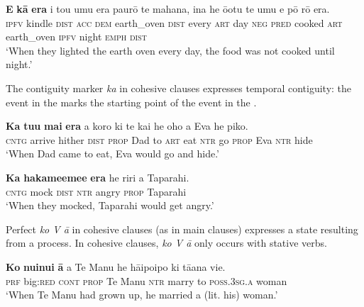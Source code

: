 \ea\label{ex:11.214}
\gll \textbf{E} \textbf{kā} \textbf{era} i tou {\ꞌ}umu era paurō te mahana,  {\ꞌ}ina he {\ꞌ}ō{\ꞌ}otu te {\ꞌ}umu e pō rō era.\\
\textsc{ipfv} kindle \textsc{dist} \textsc{acc} \textsc{dem} earth\_oven \textsc{dist} every \textsc{art} day  \textsc{neg} \textsc{pred} cooked \textsc{art} earth\_oven \textsc{ipfv} night \textsc{emph} \textsc{dist}\\

\glt 
‘When they lighted the earth oven every day, the food was not cooked until night.’ \textstyleExampleref{[R352.013]} 
\z

The contiguity marker \textit{ka} in cohesive clauses expresses temporal contiguity: the event in the  marks the starting point of the event in the .

\ea\label{ex:11.215}
\gll \textbf{Ka} \textbf{tu{\ꞌ}u} \textbf{mai} \textbf{era} a koro ki te kai he oho a Eva he piko. \\
\textsc{cntg} arrive hither \textsc{dist} \textsc{prop} Dad to \textsc{art} eat \textsc{ntr} go \textsc{prop} Eva \textsc{ntr} hide \\

\glt 
‘When Dad came to eat, Eva would go and hide.’ \textstyleExampleref{[R210.026]} 
\z

\ea\label{ex:11.216}
\gll \textbf{Ka} \textbf{hakame{\ꞌ}eme{\ꞌ}e} \textbf{era} he riri a Taparahi. \\
\textsc{cntg} mock \textsc{dist} \textsc{ntr} angry \textsc{prop} Taparahi \\

\glt 
‘When they mocked, Taparahi would get angry.’ \textstyleExampleref{[R250.151]} 
\z

Perfect  \textit{ko V {\ꞌ}ā} in cohesive clauses (as in main clauses) expresses a state resulting from a process. In cohesive clauses, \textit{ko V {\ꞌ}ā} only occurs with stative verbs.

\ea\label{ex:11.217}
\gll \textbf{Ko} \textbf{nuinui} \textbf{{\ꞌ}ā} a Te Manu he hāipoipo ki tā{\ꞌ}ana vi{\ꞌ}e.\\
\textsc{prf} big:\textsc{red} \textsc{cont} \textsc{prop} Te Manu \textsc{ntr} marry to \textsc{poss.3sg.a} woman\\

\glt 
‘When Te Manu had grown up, he married a (lit. his) woman.’ \textstyleExampleref{[R245.256]} 
\z

